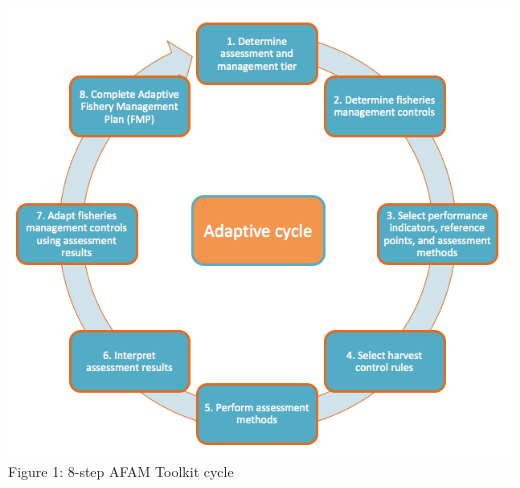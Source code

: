 \documentclass[]{book}
\begin{document}
\includegraphics{myMediaFolder/media/2_image1.png} Figure 1: 8-step AFAM
Toolkit cycle
\end{document}
